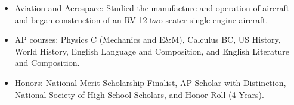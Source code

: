 \begin{tcolorbox}
\begin{minipage}[t]{0.825\textwidth}
\begin{tcolorbox}[grow to right by=0.95cm,height=0.8\textheight,colframe=white,colback=white]
{\begin{itemize}
                    
                        

                        \item Aviation and Aerospace: Studied the manufacture and operation of aircraft and began construction of an RV-12 two-seater single-engine aircraft.
                        
                        \item AP courses: Physics C (Mechanics and E\&M), Calculus BC, US History, World History, English Language and Composition, and English Literature and Composition.

                        \item Honors: National Merit Scholarship Finalist, AP Scholar with Distinction, National Society of High School Scholars, and Honor Roll (4 Years).

                        
                    \end{itemize}}

            \end{tcolorbox}
        \end{minipage}
    \end{tcolorbox}
    

